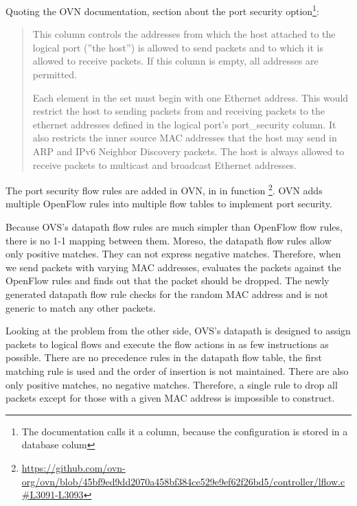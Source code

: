 Quoting the OVN documentation, section about the port security option\footnote{The documentation calls it a column, because the configuration is stored in a database colum}: 

\begin{quote}
    This column controls the addresses from which the host
    attached to the logical port (''the host'') is allowed to
    send packets and to which it is allowed to receive
    packets. If this column is empty, all addresses are
    permitted.

    Each element in the set must begin with one Ethernet
    address. This would restrict the host to sending packets
    from and receiving packets to the ethernet addresses
    defined in the logical port's port\_security column. It
    also restricts the inner source MAC addresses that the
    host may send in ARP and IPv6 Neighbor Discovery packets.
    The host is always allowed to receive packets to multicast
    and broadcast Ethernet addresses.
\end{quote}

The port security flow rules are added in OVN, in  in function \footnote{\url{https://github.com/ovn-org/ovn/blob/45bf9ed9dd2070a458bf384ce529e9ef62f26bd5/controller/lflow.c\#L3091-L3093}}. OVN adds multiple OpenFlow rules into multiple flow tables to implement port security.

Because OVS's datapath flow rules are much simpler than OpenFlow flow rules, there is no 1-1 mapping between them. Moreso, the datapath flow rules allow only positive matches. They can not express negative matches. Therefore, when we send packets with varying MAC addresses,  evaluates the packets against the OpenFlow rules and finds out that the packet should be dropped. The newly generated datapath flow rule checks for the random MAC address and is not generic to match any other packets.

Looking at the problem from the other side, OVS's datapath is designed to assign packets to logical flows and execute the flow actions in as few instructions as possible. There are no precedence rules in the datapath flow table, the first matching rule is used and the order of insertion is not maintained. There are also only positive matches, no negative matches. Therefore, a single rule to drop all packets except for those with a given MAC address is impossible to construct.

